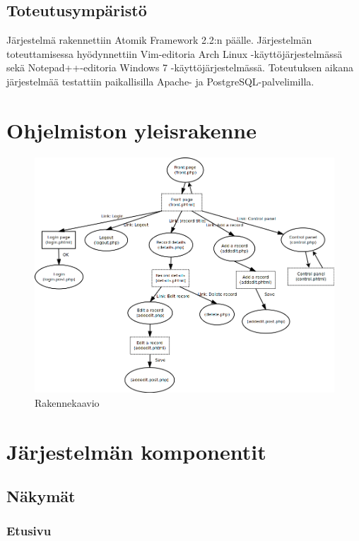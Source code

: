 \documentclass[a4paper,12pt]{report}
\begin{document}
\subsection{Toteutusympäristö}

Järjestelmä rakennettiin Atomik Framework 2.2:n päälle. Järjestelmän
toteuttamisessa hyödynnettiin Vim-editoria Arch Linux -käyttöjärjestelmässä
sekä Notepad++-editoria Windows 7 -käyttöjärjestelmässä. Toteutuksen aikana
järjestelmää testattiin paikallisilla Apache- ja PostgreSQL-palvelimilla.

\section{Ohjelmiston yleisrakenne}

\begin{figure}[H]
  \begin{center}
    \includegraphics[width=\textwidth]{diagrams/rakennekaavio}
  \end{center}
  \caption{Rakennekaavio}
\end{figure}

\section{Järjestelmän komponentit}

\subsection{Näkymät}

\subsubsection{Etusivu}
\end{document}
